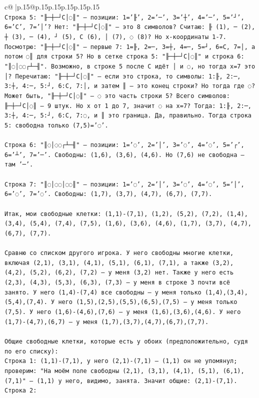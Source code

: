 \documentclass{article}
\begin{document}
{\begin{supertabular}{c@{$\;$}|p{.15\linewidth}@{}p{.15\linewidth}p{.15\linewidth}p{.15\linewidth}p{.15\linewidth}p{.15\linewidth}}
{{{\\ 
\texttt{Строка 5: "╟─┼─┘C│◌║" — позиции: 1='╟', 2='─', 3='┼', 4='─', 5='┘', 6='C', 7='│'? Нет: "╟─┼─┘C│◌║" — это 8 символов? Считаю: ╟ (1), ─ (2), ┼ (3), ─ (4), ┘ (5), C (6), │ (7), ◌ (8)? Но x{-}координаты 1{-}7. Посмотрю: "╟─┼─┘C│◌║" — первые 7: 1=╟, 2=─, 3=┼, 4=─, 5=┘, 6=C, 7=│, а потом ◌║ для строки 5? Но в сетке строка 5: "╟─┼─┘C│◌║" и строка 6: "║◌│◌◌┌┴─╢". Возможно, в строке 5 после C идёт │ и ◌, но тогда x=7 это │? Перечитаю: "╟─┼─┘C│◌║" — если это строка, то символы: 1:╟, 2:─, 3:┼, 4:─, 5:┘, 6:C, 7:│, и затем ║ — это конец строки? Но тогда где ◌? Может быть, "╟─┼─┘C│◌║" — ◌ это часть строки 5? Всего символов: ╟─┼─┘C│◌║ — 9 штук. Но x от 1 до 7, значит ◌ на x=7? Тогда: 1:╟, 2:─, 3:┼, 4:─, 5:┘, 6:C, 7:◌, и ║ это граница. Да, правильно. Тогда строка 5: свободна только (7,5)='◌'.} \\
\\ 
\texttt{Строка 6: "║◌│◌◌┌┴─╢" — позиции: 1='◌', 2='│', 3='◌', 4='◌', 5='┌', 6='┴', 7='─'. Свободны: (1,6), (3,6), (4,6). Но (7,6) не свободна — там '─'.} \\
\\ 
\texttt{Строка 7: "║◌│◌◌│◌◌║" — позиции: 1='◌', 2='│', 3='◌', 4='◌', 5='│', 6='◌', 7='◌'. Свободны: (1,7), (3,7), (4,7), (6,7), (7,7).} \\
\\ 
\texttt{Итак, мои свободные клетки: (1,1){-}(7,1), (1,2), (5,2), (7,2), (1,4), (3,4), (5,4), (7,4), (7,5), (1,6), (3,6), (4,6), (1,7), (3,7), (4,7), (6,7), (7,7).} \\
\\ 
\texttt{Сравню со списком другого игрока. У него свободны многие клетки, включая (2,1), (3,1), (4,1), (5,1), (6,1), (7,1), а также (3,2), (4,2), (5,2), (6,2), (7,2) — у меня (3,2) нет. Также у него есть (2,3), (4,3), (5,3), (6,3), (7,3) — у меня в строке 3 почти всё занято. У него (1,4){-}(7,4) все свободны — у меня только (1,4),(3,4),(5,4),(7,4). У него (1,5),(2,5),(5,5),(6,5),(7,5) — у меня только (7,5). У него (1,6){-}(4,6),(7,6) — у меня (1,6),(3,6),(4,6). У него (1,7){-}(4,7),(6,7) — у меня (1,7),(3,7),(4,7),(6,7),(7,7).} \\
\\ 
\texttt{Общие свободные клетки, которые есть у обоих (предположительно, судя по его списку):} \\
\texttt{Строка 1: (1,1){-}(7,1), у него (2,1){-}(7,1) — (1,1) он не упомянул; проверим: "На моём поле свободны (2,1), (3,1), (4,1), (5,1), (6,1), (7,1)" — (1,1) у него, видимо, занята. Значит общие: (2,1){-}(7,1).} \\
\texttt{Строка 2:} \\
            }
        }
    }
     \\ \\


\end{supertabular}}
\end{document}
